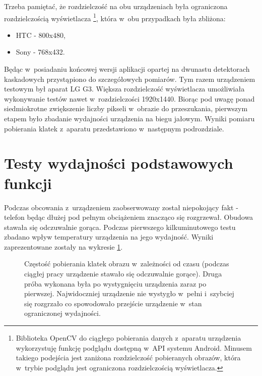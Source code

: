 Trzeba pamiętać, że rozdzielczość na obu urządzeniach była ograniczona
rozdzielczością wyświetlacza \footnote{Biblioteka OpenCV do ciągłego pobierania
	danych z~aparatu urządzenia wykorzystuję funkcję podglądu 
	dostępną w~API systemu Android. Minusem takiego podejścia 
	jest zaniżona rozdzielczość pobieranych obrazów, która w~trybie podglądu jest ograniczona
	rozdzielczością wyświetlacza.}, która w~obu przypadkach była zbliżona:
\begin{itemize}
	\item HTC - 800x480,
	\item Sony - 768x432.
\end{itemize}

Będąc w~posiadaniu końcowej wersji aplikacji opartej na dwunastu
detektorach kaskadowych przystąpiono do szczegółowych pomiarów. 
Tym razem urządzeniem testowym był aparat LG G3. Większa rozdzielczość
wyświetlacza umożliwiała wykonywanie testów nawet w~rozdzielczości 1920x1440.
Biorąc pod uwagę ponad siedmiokrotne zwiększenie liczby pikseli 
w~obrazie do przeszukania, pierwszym etapem było zbadanie 
wydajności urządzenia na biegu jałowym. Wyniki pomiaru 
pobierania klatek z~aparatu przedstawiono w~następnym podrozdziale. 

\section{Testy wydajności podstawowych funkcji}

Podczas obcowania z~urządzeniem zaobserwowany został niepokojący fakt - telefon
będąc dłużej pod pełnym obciążeniem znacząco się rozgrzewał. Obudowa 
stawała się odczuwalnie gorąca. Podczas pierwszego kilkuminutowego
testu zbadano wpływ temperatury urządzenia na jego wydajność. Wyniki zaprezentowane
zostały na wykresie \ref{chart:time_2_temp_2_fps}. 

\begin{figure}[h!]
	\begin{center}
	\end{center}
	\caption{Częstość pobierania klatek obrazu w~zależności od czasu (podczas 
		ciągłej pracy urządzenie stawało się odczuwalnie gorące). 
		Druga próba wykonana była po wystygnięciu urządzenia zaraz po pierwszej.
		Najwidoczniej urządzenie nie wystygło w~pełni i~szybciej się rozgrzało
		co spowodowało przejście urządzenie w~stan ograniczonej wydajności.}
	\label{chart:time_2_temp_2_fps}
\end{figure}

